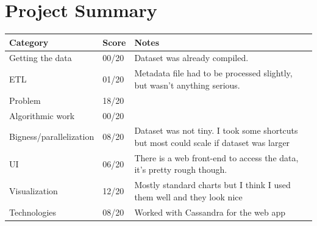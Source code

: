 \documentclass[a4paper,10pt]{article}
\begin{document}
\section*{Project Summary}
\begin{center}
    \begin{tabular}{l l l}
    \textbf{Category} & \textbf{Score} & \textbf{Notes} \\
    \hline
    Getting the data        & 00/20 & Dataset was already compiled. \\
    ETL                     & 01/20 & Metadata file had to be processed slightly, but wasn't anything serious. \\
    Problem                 & 18/20 & \\
    Algorithmic work        & 00/20 & \\
    Bigness/parallelization & 08/20 & Dataset was not tiny. I took some shortcuts but most could scale if dataset was larger \\
    UI                      & 06/20 & There is a web front-end to access the data, it's pretty rough though. \\
    Visualization           & 12/20 & Mostly standard charts but I think I used them well and they look nice \\ 
    Technologies            & 08/20 & Worked with Cassandra for the web app \\
    \end{tabular}
\end{center}
\end{document}
